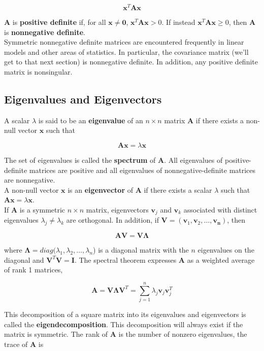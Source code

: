 \documentclass[11pt]{article}
\theoremstyle{definition}
\begin{document}
\[\mathbf{x}^T\mathbf{Ax}\]

$\mathbf{A}$ is \textbf{positive definite} if, for all $\mathbf{x} \neq \mathbf{0}$, $\mathbf{x}^T\mathbf{Ax} > 0$.  If instead $\mathbf{x}^T\mathbf{Ax} \geq 0$, then $\mathbf{A}$ is \textbf{nonnegative definite}.\\

Symmetric nonnegative definite matrices are encountered frequently in linear models and other areas of statistics.  In particular, the covariance matrix (we'll get to that next section) is nonnegative definite.  In addition, any positive definite matrix is nonsingular.

\subsection{Eigenvalues and Eigenvectors}
A scalar $\lambda$ is said to be an \textbf{eigenvalue} of an $n \times n$ matrix $\mathbf{A}$ if there exists a non-null vector $\mathbf{x}$ such that

\[\mathbf{Ax} = \lambda\mathbf{x}\]

The set of eigenvalues is called the \textbf{spectrum} of $\mathbf{A}$.  All eigenvalues of positive-definite matrices are positive and all eigenvalues of nonnegative-definite matrices are nonnegative. \\

 A non-null vector $\mathbf{x}$ is an \textbf{eigenvector} of $\mathbf{A}$ if there exists a scalar $\lambda$ such that $\mathbf{Ax} = \lambda\mathbf{x}$.\\
 
If  $\mathbf{A}$ is a symmetric $n \times n$ matrix, eigenvectors $\mathbf{v}_j$ and $\mathbf{v}_k$ associated with distinct eigenvalues $\lambda_j \neq \lambda_k$ are orthogonal.  In addition, if $\mathbf{V} = (\mathbf{v}_1, \mathbf{v}_2, \hdots, \mathbf{v_n})$, then 

\[ \mathbf{AV} = \mathbf{V\Lambda}\]

where $\mathbf{\Lambda} = diag(\lambda_1, \lambda_2, \hdots, \lambda_n$) is a diagonal matrix with the $n$ eigenvalues on the diagonal and $\mathbf{V}^T\mathbf{V} = \mathbf{I}$.  The spectral theorem expresses $\mathbf{A}$ as a weighted average of rank 1 matrices,

\[\mathbf{A} = \mathbf{V\Lambda V}^T = \sum_{j=1}^n \lambda_j \mathbf{v}_j \mathbf{v}_j ^T\]

This decomposition of a square matrix into its eigenvalues and eigenvectors is called the \textbf{eigendecomposition}.  This decomposition will always exist if the matrix is symmetric.  The rank of $\mathbf{A}$ is the number of nonzero eigenvalues, the trace of $\mathbf{A}$ is
\end{document}
